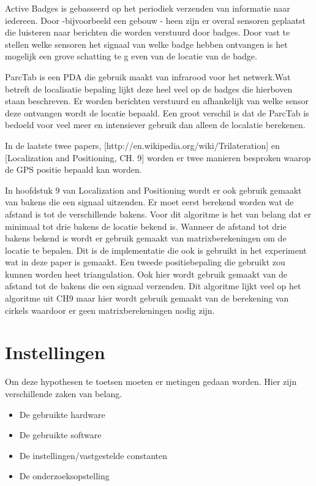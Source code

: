 \documentclass{article}
\begin{document}
Active Badges is gebasseerd op het periodiek verzenden van informatie naar iedereen. Door -bijvoorbeeld een gebouw - heen zijn er overal sensoren geplaatst die luisteren naar berichten die worden verstuurd door badges. Door vast te stellen welke sensoren het signaal van welke badge hebben ontvangen is het mogelijk een grove schatting te g
even van de locatie van de badge.
\newline 

ParcTab is een PDA die gebruik maakt van infrarood voor het netwerk.Wat betreft de localisatie bepaling lijkt deze heel veel op de badges die hierboven staan beschreven. Er worden berichten verstuurd en afhankelijk van welke sensor deze ontvangen wordt de locatie bepaald. Een groot verschil is dat de ParcTab is bedoeld voor veel meer en intensiever gebruik dan alleen de localatie berekenen. 

In de laatste twee papers, [http://en.wikipedia.org/wiki/Trilateration] en [Localization and Positioning, CH. 9] worden er twee manieren besproken waarop de GPS positie bepaald kan worden. 

In hoofdstuk 9 van Localization and Positioning wordt er ook gebruik gemaakt van bakens die een signaal uitzenden. Er moet eerst berekend worden wat de afstand is tot de verschillende bakens. Voor dit algoritme is het van belang dat er minimaal tot drie bakens de locatie bekend is. Wanneer de afstand tot drie bakens bekend is wordt er gebruik gemaakt van matrixberekeningen om de locatie te bepalen. Dit is de implementatie die ook is gebruikt in het experiment wat in deze paper is gemaakt.
\newline
Een tweede positiebepaling die gebruikt zou kunnen worden heet triangulation. Ook hier wordt gebruik gemaakt van de afstand tot de bakens die een signaal verzenden. Dit algoritme lijkt veel op het algoritme uit CH9 maar hier wordt gebruik gemaakt van de berekening van cirkels waardoor er geen matrixberekeningen nodig zijn. 




\section{Instellingen}
Om deze hypothesen te toetsen moeten er metingen gedaan worden. Hier zijn verschillende zaken van belang. 
\begin{itemize}
	\item De gebruikte hardware
	\item De gebruikte software
	\item De instellingen/vastgestelde constanten
	\item De onderzoeksopstelling
\end{itemize}
\end{document}
